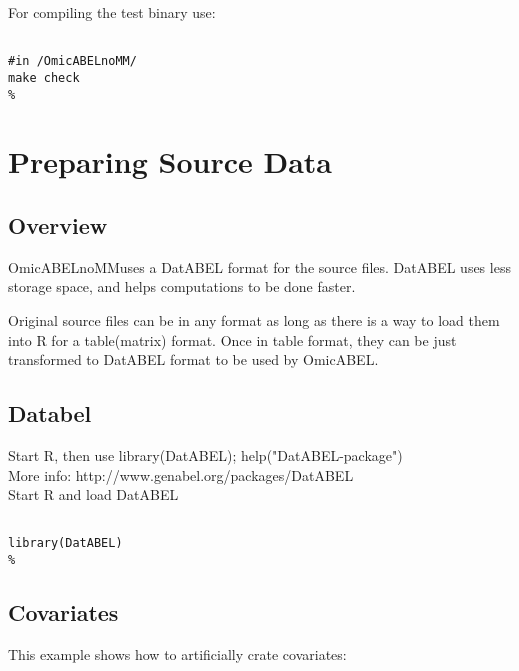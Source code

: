 \documentclass{report}
\newcommand{\oanomm}{OmicABELnoMM}
\begin{document}
For compiling the test binary use:
\begin{lstlisting}[escapechar=\%]

#in /OmicABELnoMM/
make check
%
\end{lstlisting}

\chapter{Preparing Source Data}

\section{Overview}

\oanomm uses a DatABEL format for the source files. DatABEL uses less storage space, and helps computations to be done faster.

Original source files can be in any format as long as there is a way to load them into R for a table(matrix) format. Once in table format, they can be just transformed to DatABEL format to be used by OmicABEL.


\section{Databel}
Start R, then use library(DatABEL); help("DatABEL-package")\\
More info: http://www.genabel.org/packages/DatABEL\\
Start R and load DatABEL

\begin{lstlisting}[escapechar=\%]

library(DatABEL)
%
\end{lstlisting}

\section{Covariates}

This example shows how to artificially crate covariates:
\end{document}
